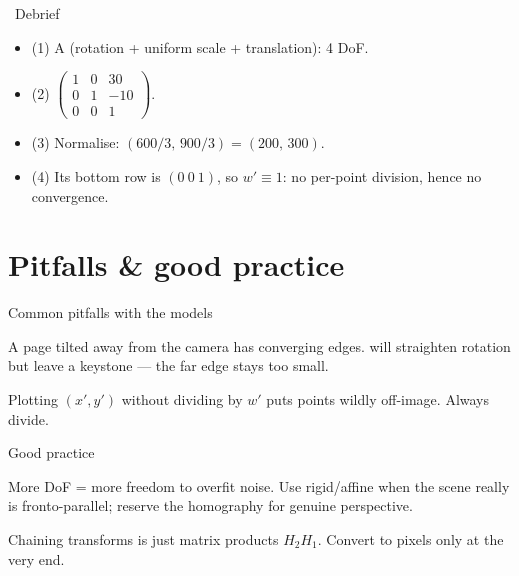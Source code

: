 \documentclass[10pt,aspectratio=169]{beamer}
\begin{document}
\begin{frame}{\faPen~Debrief}
  \begin{itemize}
    \item (1) A  (rotation + uniform scale + translation): 4 DoF.
    \item (2) $\begin{pmatrix}1&0&30\\0&1&-10\\0&0&1\end{pmatrix}$.
    \item (3) Normalise: $(600/3,\,900/3)=(200,\,300)$.
    \item (4) Its bottom row is $(0\ 0\ 1)$, so $w'\equiv1$: no per-point division, hence no convergence.
  \end{itemize}
\end{frame}

\section{Pitfalls \& good practice}

\begin{frame}{Common pitfalls with the models}
  \begin{badbox}
    A page tilted away from the camera has converging edges.  will straighten
    rotation but leave a keystone — the far edge stays too small.
  \end{badbox}
  \begin{badbox}
    Plotting $(x',y')$ without dividing by $w'$ puts points wildly off-image. Always divide.
  \end{badbox}
\end{frame}

\begin{frame}{Good practice}
  \begin{goodbox}
    More DoF = more freedom to overfit noise. Use rigid/affine when the scene really is fronto-parallel;
    reserve the homography for genuine perspective.
  \end{goodbox}
  \begin{goodbox}
    Chaining transforms is just matrix products $H_2H_1$. Convert to pixels only at the very end.
  \end{goodbox}
\end{frame}
\end{document}
